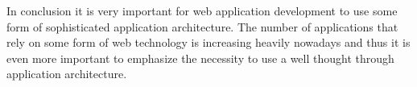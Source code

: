 In conclusion it is very important for web application development to use some form of sophisticated application architecture. The number of applications that rely on some form of web technology is increasing heavily nowadays and thus it is even more important to emphasize the necessity to use a well thought through application architecture.

